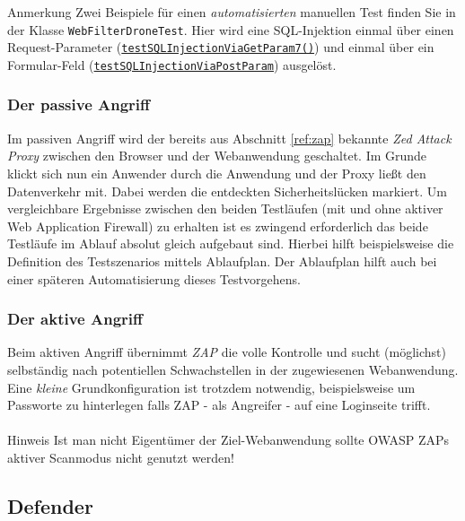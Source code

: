 \textcolor{bhtGray}{ Anmerkung} Zwei Beispiele für einen \glqq\emph{automatisierten}\grqq{} manuellen Test finden Sie in der Klasse \verb=WebFilterDroneTest=. Hier wird eine SQL-Injektion einmal über einen Request-Parameter (\href{https://github.com/devtty/webcastellum/blob/3c45a017e2aa17e553d2517308210ab7bf614904/src/test/java/org/webcastellum/test/WebFilterDroneTest.java\#L88}{\verb=testSQLInjectionViaGetParam7()=}) und einmal über ein Formular-Feld (\href{https://github.com/devtty/webcastellum/blob/3c45a017e2aa17e553d2517308210ab7bf614904/src/test/java/org/webcastellum/test/WebFilterDroneTest.java\#L121}{\verb=testSQLInjectionViaPostParam=}) ausgelöst.


\subsubsection{Der passive Angriff}
Im passiven Angriff wird der bereits aus Abschnitt \ref{ref:zap} bekannte \emph{Zed Attack Proxy} zwischen den Browser und der Webanwendung geschaltet. Im Grunde klickt sich nun ein Anwender durch die Anwendung und der Proxy ließt den Datenverkehr mit. Dabei werden die entdeckten Sicherheitslücken markiert. Um vergleichbare Ergebnisse zwischen den beiden Testläufen (mit und ohne aktiver Web Application Firewall) zu erhalten ist es zwingend erforderlich das beide Testläufe im Ablauf absolut gleich aufgebaut sind. Hierbei hilft beispielsweise die Definition des Testszenarios mittels Ablaufplan. Der Ablaufplan hilft auch bei einer späteren Automatisierung dieses Testvorgehens.

\subsubsection{Der aktive Angriff}
Beim aktiven Angriff übernimmt \emph{ZAP} die volle Kontrolle und sucht (möglichst) selbständig nach potentiellen Schwachstellen in der zugewiesenen Webanwendung. Eine \emph{kleine} Grundkonfiguration ist trotzdem notwendig, beispielsweise um Passworte zu hinterlegen falls ZAP - als Angreifer - auf eine Loginseite trifft. \\\\
\textcolor{bhtGray}{ Hinweis} Ist man nicht Eigentümer der Ziel-Webanwendung sollte OWASP ZAPs aktiver Scanmodus nicht genutzt werden!\\


\subsection{Defender}

